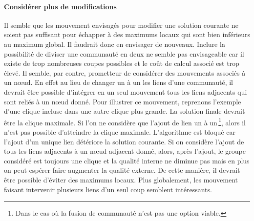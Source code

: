 \paragraph{Considérer plus de modifications}
Il semble que les mouvement envisagés pour modifier une solution courante ne soient pas suffisant pour échapper à des maximums locaux qui sont bien inférieurs au maximum global.
Il faudrait donc en envisager de nouveaux.
Inclure la possibilité de diviser une communauté en deux ne semble pas envisageable car il existe de trop nombreuses coupes possibles et le coût de calcul associé est trop élevé.
Il semble, par contre, prometteur de considérer des mouvements associés à un n\oe ud.
En effet au lieu de changer un à un les liens d'une communauté, il devrait être possible d'intégrer en un seul mouvement tous les liens adjacents qui sont reliés à un n\oe ud donné.
Pour illustrer ce mouvement, reprenons l'exemple d'une clique incluse dans une autre clique plus grande.
La solution finale devrait être la clique maximale.
Si l'on ne considère que l'ajout de lien un à un\,\footnote{Dans le cas où la fusion de communauté n'est pas une option viable.}, alors il n'est pas possible d'atteindre la clique maximale.
L'algorithme est bloqué car l'ajout d'un unique lien détériore la solution courante.
Si on considère l'ajout de tous les liens adjacents à un n\oe ud adjacent donné, alors, après l'ajout, le groupe considéré est toujours une clique et la qualité interne ne diminue pas mais en plus on peut espérer faire augmenter la qualité externe.
De cette manière, il devrait être possible d'éviter des maximums locaux.
Plus globalement, les mouvement faisant intervenir plusieurs liens d'un seul coup semblent intéressants.



